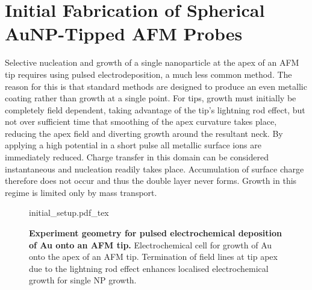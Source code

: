 \documentclass{article}
\begin{document}
\section{Initial Fabrication of Spherical AuNP-Tipped AFM Probes}
\label{sec:initial_fabrication}


Selective nucleation and growth of a single nanoparticle at the apex of an AFM tip requires using pulsed electrodeposition, a much less common method. The reason for this is that standard methods are designed to produce an even metallic coating rather than growth at a single point. For tips, growth must initially be completely field dependent, taking advantage of the tip's lightning rod effect, but not over sufficient time that smoothing of the apex curvature takes place, reducing the apex field and diverting growth around the resultant neck. By applying a high potential in a short pulse all metallic surface ions are immediately reduced. Charge transfer in this domain can be considered instantaneous and nucleation readily takes place. Accumulation of surface charge therefore does not occur and thus the double layer never forms. Growth in this regime is limited only by mass transport.

\begin{figure}[bt]
\centering
{\fontsize{10pt}{1em}\selectfont \def\svgwidth{0.6\textwidth} {initial_setup.pdf_tex}}
\caption[Experiment geometry for pulsed electrochemical deposition of Au onto an AFM tip]{\textbf{Experiment geometry for pulsed electrochemical deposition of Au onto an AFM tip.} Electrochemical cell for growth of Au onto the apex of an AFM tip. Termination of field lines at tip apex due to the lightning rod effect enhances localised electrochemical growth for single NP growth.}
\label{fig:initial_setup}
\end{figure}
\end{document}
